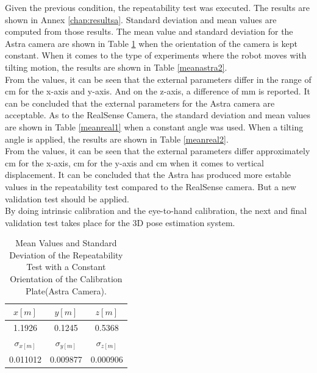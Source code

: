 Given the previous condition, the repeatability test was executed. The results are shown in Annex \ref{chap:resultsa}. Standard deviation and mean values are computed from those results. The mean value and standard deviation for the Astra camera are shown in Table \ref{meanastra1} when the orientation of the camera is kept constant. When it comes to the type of experiments where the robot moves with tilting motion, the results are shown in Table \ref{meanastra2}.\\
From the values, it can be seen that the external parameters differ in the range of \unit[1]{cm} for the x-axis and y-axis. And on the z-axis, a difference of \unit[1] {mm} is reported. It can be concluded that the external parameters for the Astra camera are acceptable.
As to the RealSense Camera, the standard deviation and mean values are shown in Table \ref{meanreal1} when a constant angle was used. When a tilting angle is applied, the results are shown in Table \ref{meanreal2}.\\
From the values, it can be seen that the external parameters differ approximately \unit[1]{cm} for the x-axis, \unit[2] {cm} for the y-axis and \unit[1] {cm}  when it comes to vertical displacement.  It can be concluded that the Astra has produced more estable values in the repeatability test compared to the RealSense camera. But a new validation test should be applied. \\
By doing intrinsic calibration and the eye-to-hand calibration, the next and final validation test takes place for the 3D pose estimation system.


\begin{table}[ht]
\renewcommand{\arraystretch}{1.3}
\caption{Mean Values and Standard Deviation of the Repeatability Test with a Constant Orientation of the Calibration Plate(Astra Camera).}
\label{meanastra1}
\centering
\begin{tabular}{|c|c|c|}
\hline
$x[m]$ & $y[m]$ & $z[m]$ \\
\hline
1.1926 & 0.1245 & 0.5368 \\
\hline
\hline
$\sigma_{x[m]}$ & $\sigma_{y[m]}$ & $\sigma_{z[m]}$ \\
\hline
0.011012&	0.009877	&0.000906 \\
\hline
\end{tabular}
\end{table}



